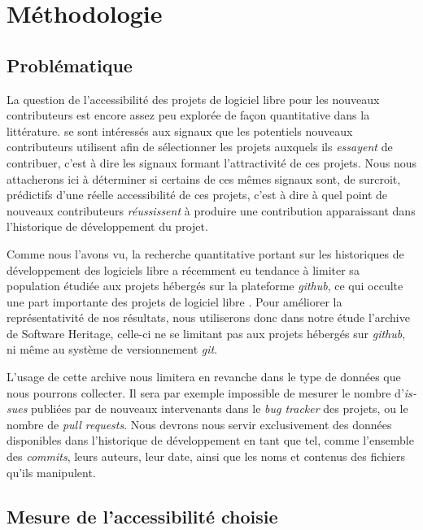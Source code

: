 \documentclass[dvipsnames]{llncs}
\newcommand{\en}[1]{\foreignlanguage{english}{\emph{#1}}}
\begin{document}
    \section{Méthodologie}

    \subsection{Problématique}

    La question de l'accessibilité des projets de logiciel libre pour les nouveaux contributeurs est encore
    assez peu explorée de façon quantitative dans la littérature. \textcite{signals-2019} se sont intéressés
    aux signaux que les potentiels nouveaux contributeurs utilisent afin de sélectionner les projets auxquels
    ils \emph{essayent} de contribuer, c'est à dire les signaux formant l'attractivité de ces projets. Nous
    nous attacherons ici à déterminer si certains de ces mêmes signaux sont, de surcroit, prédictifs d'une
    réelle accessibilité de ces projets, c'est à dire à quel point de nouveaux contributeurs
    \emph{réussissent} à produire une contribution apparaissant dans l'historique de développement du projet.

    Comme nous l'avons vu, la recherche quantitative portant sur les historiques de développement des
    logiciels libre a récemment eu tendance à limiter sa population étudiée aux projets hébergés sur la
    plateforme \en{github}, ce qui occulte une part importante des projets de logiciel libre
    \parencites{mining-github-2014}{penumbra-oss-2022}. Pour améliorer la représentativité de nos résultats,
    nous utiliserons donc dans notre étude l'archive de Software Heritage, celle-ci ne se limitant pas aux
    projets hébergés sur \en{github}, ni même au système de versionnement \en{git}.

    L'usage de cette archive nous limitera en revanche dans le type de données que nous pourrons collecter. Il
    sera par exemple impossible de mesurer le nombre d'\en{issues} publiées par de nouveaux intervenants dans
    le \en{bug tracker} des projets, ou le nombre de \en{pull requests}. Nous devrons nous servir
    exclusivement des données disponibles dans l'historique de développement en tant que tel, comme l'ensemble
    des \en{commits}, leurs auteurs, leur date, ainsi que les noms et contenus des fichiers qu'ils manipulent.

    \subsection{Mesure de l'accessibilité choisie}
\end{document}
